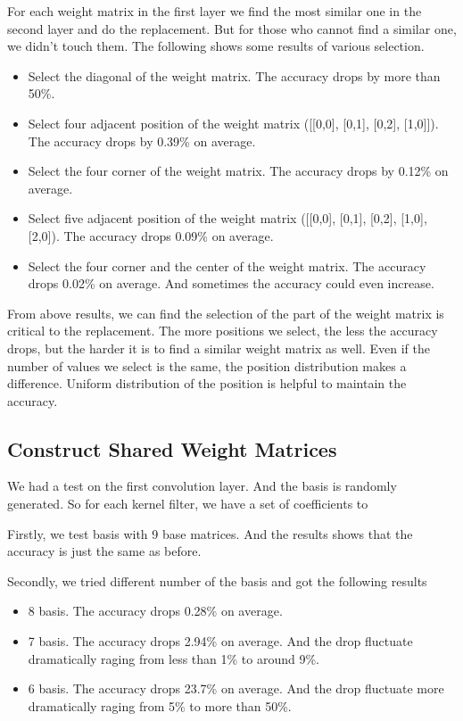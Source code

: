 \documentclass[letterpaper, 10 pt, conference]{ieeeconf}  %
\begin{document}
For each weight matrix in the first layer we find the most similar one in the second layer and do the replacement. But for those who cannot find a similar one, we didn't touch them. The following shows some results of various selection.

\begin{itemize}
\item Select the diagonal of the weight matrix. The accuracy drops by more than 50\%.
\item Select four adjacent position of the weight matrix ([[0,0], [0,1], [0,2], [1,0]]). The accuracy drops by 0.39\% on average.
\item Select the four corner of the weight matrix. The accuracy drops by 0.12\% on average.
\item Select five adjacent position of the weight matrix ([[0,0], [0,1], [0,2], [1,0], [2,0]). The accuracy drops 0.09\% on average.
\item Select the four corner and the center of the weight matrix. The accuracy drops 0.02\% on average. And sometimes the accuracy could even increase.

\end{itemize}

From above results, we can find the selection of the part of the weight matrix is critical to the replacement. The more positions we select, the less the accuracy drops, but the harder it is to find a similar weight matrix as well. Even if the number of values we select is the same, the position distribution makes a difference. Uniform distribution of the position is helpful to maintain the accuracy.

\subsection{Construct Shared Weight Matrices}
We had a test on the first convolution layer. And the basis is randomly generated. So for each kernel filter, we have a set of coefficients to 

Firstly, we test basis with 9 base matrices. And the results shows that the accuracy is just the same as before.

Secondly, we tried different number of the basis and got the following results

\begin{itemize}
\item 8 basis. The accuracy drops 0.28\% on average.
\item 7 basis. The accuracy drops 2.94\% on average. And the drop fluctuate dramatically raging from less than 1\% to around 9\%.
\item 6 basis. The accuracy drops 23.7\% on average. And the drop fluctuate more dramatically raging from 5\% to more than 50\%. 
\end{itemize}
\end{document}
